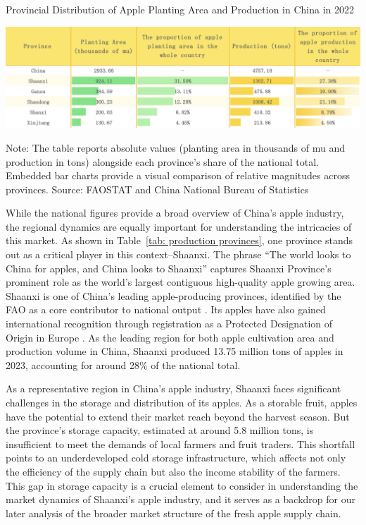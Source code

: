 \begin{table}[hpt]
    \centering
        \caption{Provincial Distribution of Apple Planting Area and Production in China in 2022}
    \includegraphics[width=\linewidth]{tables/production_provinces_table.png}
    \label{tab: production provinces}
    \begin{tablenotes}
    \footnotesize
    \item Note: The table reports absolute values (planting area in thousands of mu and production in tons) alongside each province's share of the national total. Embedded bar charts provide a visual comparison of relative magnitudes across provinces. Source: FAOSTAT and China National Bureau of Statistics
    \end{tablenotes}
\end{table}


While the national figures provide a broad overview of China's apple industry, the regional dynamics are equally important for understanding the intricacies of this market. As shown in Table~\ref{tab: production provinces}, one province stands out as a critical player in this context--Shaanxi. The phrase ``The world looks to China for apples, and China looks to Shaanxi'' captures Shaanxi Province's prominent role as the world's largest contiguous high-quality apple growing area. Shaanxi is one of China's leading apple-producing provinces, identified by the FAO as a core contributor to national output \citep{FAO2004}. Its apples have also gained international recognition through registration as a Protected Designation of Origin in Europe \citep{UKGov2021}. As the leading region for both apple cultivation area and production volume in China, Shaanxi produced 13.75 million tons of apples in 2023, accounting for around 28\% of the national total.

As a representative region in China's apple industry, Shaanxi faces significant challenges in the storage and distribution of its apples. As a storable fruit, apples have the potential to extend their market reach beyond the harvest season. But the province's storage capacity, estimated at around 5.8 million tons, is insufficient to meet the demands of local farmers and fruit traders. This shortfall points to an underdeveloped cold storage infrastructure, which affects not only the efficiency of the supply chain but also the income stability of the farmers. This gap in storage capacity is a crucial element to consider in understanding the market dynamics of Shaanxi's apple industry, and it serves as a backdrop for our later analysis of the broader market structure of the fresh apple supply chain.



